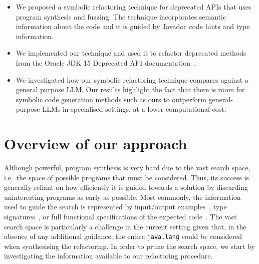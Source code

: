 \documentclass[10pt,conference]{IEEEtran}
\begin{document}
\begin{itemize}

\item We proposed a symbolic refactoring technique for deprecated APIs that uses program synthesis and fuzzing. The technique incorporates semantic information about the code and it is guided by Javadoc code hints and type information.


\item We implemented our technique and used it to refactor deprecated methods from the Oracle
JDK 15 Deprecated API documentation~\cite{OracleJdk15DeprecatedAPI}.

\item We investigated how our symbolic refactoring technique compares against a general purpose LLM. %
  Our results highlight the fact that there is room for
symbolic code generation methods such as ours to outperform general-purpose LLMs in specialised settings, at a lower computational cost.


\end{itemize}  



\section{Overview of our approach} \label{sec:overview}


Although powerful, program synthesis is very hard due to the vast search space, i.e.~the space of possible programs that must be considered. Thus, its success is generally reliant on how efficiently it is guided towards a solution by discarding uninteresting programs as early as possible. Most commonly, the information used to guide the search is represented by input/output examples~\cite{DBLP:conf/pldi/FeserCD15}, type signatures~\cite{DBLP:conf/pldi/OseraZ15}, or full functional specifications of the expected code~\cite{DBLP:conf/ijcai/MannaW79}.
%
The vast search space is particularly a challenge in the current
setting given that, in the absence of any additional guidance, the
entire \texttt{java.lang} could be considered when synthesising the
refactoring.  In order to prune the search space, we start by
investigating the information available to our refactoring procedure.
\end{document}
